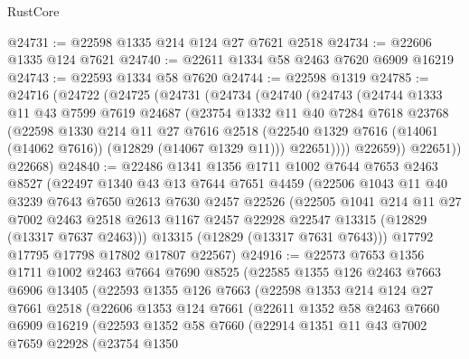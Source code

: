 \begin{lexlean}{RustCore}
\begin{coremodule}
@24731 := @22598 @1335 @214 @124 @27 @7621 @2518
@24734 := @22606 @1335 @124 @7621
@24740 := @22611 @1334 @58 @2463 @7620 @6909 @16219
@24743 := @22593 @1334 @58 @7620
@24744 := @22598 @1319
@24785 := @24716
    (@24722
      (@24725
        (@24731
          (@24734
            (@24740
              (@24743
                (@24744
                  @1333
                  @11
                  @43
                  @7599
                  @7619
                  @24687
                  (@23754
                    @1332
                    @11
                    @40
                    @7284
                    @7618
                    @23768
                    (@22598
                      @1330
                      @214
                      @11
                      @27
                      @7616
                      @2518
                      (@22540 @1329 @7616 (@14061 (@14062 @7616)) (@12829 (@14067 @1329 @11)))
                      @22651))))
              @22659))
          @22651))
      @22668)
@24840 := @22486
    @1341
    @1356
    @1711
    @1002
    @7644
    @7653
    @2463
    @8527
    (@22497
      @1340
      @43
      @13
      @7644
      @7651
      @4459
      (@22506
        @1043
        @11
        @40
        @3239
        @7643
        @7650
        @2613
        @7630
        @2457
        @22526
        (@22505
          @1041
          @214
          @11
          @27
          @7002
          @2463
          @2518
          @2613
          @1167
          @2457
          @22928
          @22547
          @13315
          (@12829 (@13317 @7637 @2463)))
        @13315
        (@12829 (@13317 @7631 @7643)))
      @17792
      @17795
      @17798
      @17802
      @17807
      @22567)
@24916 := @22573
    @7653
    @1356
    @1711
    @1002
    @2463
    @7664
    @7690
    @8525
    (@22585
      @1355
      @126
      @2463
      @7663
      @6906
      @13405
      (@22593
        @1355
        @126
        @7663
        (@22598
          @1353
          @214
          @124
          @27
          @7661
          @2518
          (@22606
            @1353
            @124
            @7661
            (@22611
              @1352
              @58
              @2463
              @7660
              @6909
              @16219
              (@22593
                @1352
                @58
                @7660
                (@22914
                  @1351
                  @11
                  @43
                  @7002
                  @7659
                  @22928
                  (@23754
                    @1350

\end{coremodule}
\end{lexlean}
